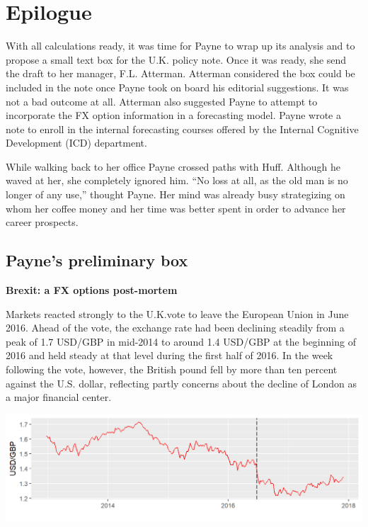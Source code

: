 \documentclass[]{book}
\theoremstyle{definition}
\theoremstyle{definition}
\theoremstyle{definition}
\theoremstyle{remark}
\begin{document}
\chapter{Epilogue}\label{epilogue}

With all calculations ready, it was time for Payne to wrap up its
analysis and to propose a small text box for the U.K. policy note. Once
it was ready, she send the draft to her manager, F.L. Atterman. Atterman
considered the box could be included in the note once Payne took on
board his editorial suggestions. It was not a bad outcome at all.
Atterman also suggested Payne to attempt to incorporate the FX option
information in a forecasting model. Payne wrote a note to enroll in the
internal forecasting courses offered by the Internal Cognitive
Development (ICD) department.

While walking back to her office Payne crossed paths with Huff. Although
he waved at her, she completely ignored him. ``No loss at all, as the
old man is no longer of any use,'' thought Payne. Her mind was already
busy strategizing on whom her coffee money and her time was better spent
in order to advance her career prospects.

\section{Payne's preliminary box}\label{paynes-preliminary-box}

 \textbf{Brexit: a FX options post-mortem}

Markets reacted strongly to the U.K.vote to leave the European Union in
June 2016. Ahead of the vote, the exchange rate had been declining
steadily from a peak of 1.7 USD/GBP in mid-2014 to around 1.4 USD/GBP at
the beginning of 2016 and held steady at that level during the first
half of 2016. In the week following the vote, however, the British pound
fell by more than ten percent against the U.S. dollar, reflecting partly
concerns about the decline of London as a major financial center.

\includegraphics[width=1\linewidth]{images/unnamed-chunk-69-1}
\end{document}
